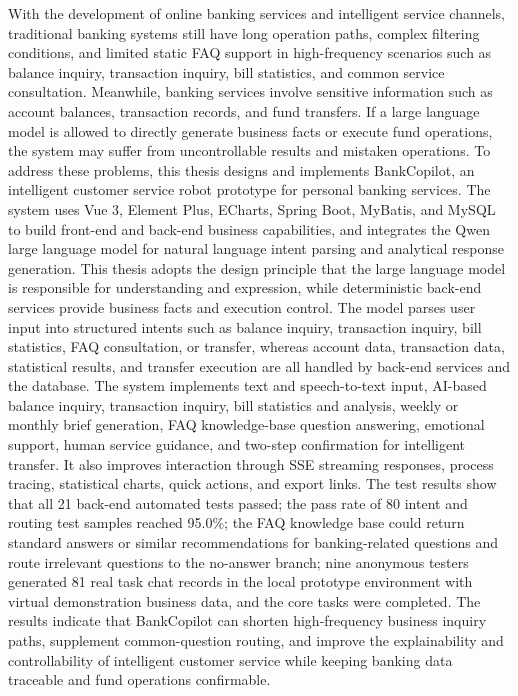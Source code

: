 \documentclass[bachelor, print]{xduthesis}
\begin{document}
\begin{eabstract}
With the development of online banking services and intelligent service channels, traditional banking systems still have long operation paths, complex filtering conditions, and limited static FAQ support in high-frequency scenarios such as balance inquiry, transaction inquiry, bill statistics, and common service consultation. Meanwhile, banking services involve sensitive information such as account balances, transaction records, and fund transfers. If a large language model is allowed to directly generate business facts or execute fund operations, the system may suffer from uncontrollable results and mistaken operations. To address these problems, this thesis designs and implements BankCopilot, an intelligent customer service robot prototype for personal banking services. The system uses Vue 3, Element Plus, ECharts, Spring Boot, MyBatis, and MySQL to build front-end and back-end business capabilities, and integrates the Qwen large language model for natural language intent parsing and analytical response generation. This thesis adopts the design principle that the large language model is responsible for understanding and expression, while deterministic back-end services provide business facts and execution control. The model parses user input into structured intents such as balance inquiry, transaction inquiry, bill statistics, FAQ consultation, or transfer, whereas account data, transaction data, statistical results, and transfer execution are all handled by back-end services and the database. The system implements text and speech-to-text input, AI-based balance inquiry, transaction inquiry, bill statistics and analysis, weekly or monthly brief generation, FAQ knowledge-base question answering, emotional support, human service guidance, and two-step confirmation for intelligent transfer. It also improves interaction through SSE streaming responses, process tracing, statistical charts, quick actions, and export links. The test results show that all 21 back-end automated tests passed; the pass rate of 80 intent and routing test samples reached 95.0\%; the FAQ knowledge base could return standard answers or similar recommendations for banking-related questions and route irrelevant questions to the no-answer branch; nine anonymous testers generated 81 real task chat records in the local prototype environment with virtual demonstration business data, and the core tasks were completed. The results indicate that BankCopilot can shorten high-frequency business inquiry paths, supplement common-question routing, and improve the explainability and controllability of intelligent customer service while keeping banking data traceable and fund operations confirmable.
\end{eabstract}
\end{document}
